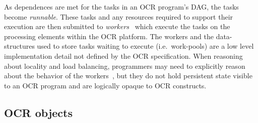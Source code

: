 As dependences are met for the tasks in an OCR program's DAG, the
tasks become \emph{runnable}. These tasks and any resources required
to support their execution are then submitted to
\emph{workers}~\cite{GBRS09} which execute the tasks on
the processing elements within the OCR platform. The workers and the
data-structures used to store tasks waiting to execute
(i.e.\ work-pools) are a low level implementation detail not defined by
the OCR specification. When reasoning about locality and load
balancing, programmers may need to explicitly reason about the
behavior of the workers~\cite{Chatterjee13}, but they do not hold
persistent state visible to an OCR program and are logically opaque to
OCR constructs.
%
%

\subsection{OCR objects}
\label{sec:OCRobjects}


